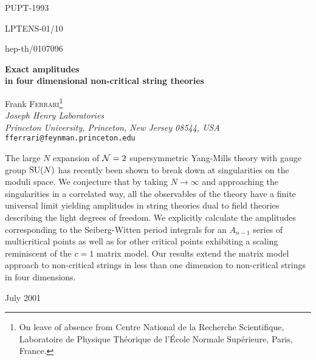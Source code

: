 \documentclass[a4paper,12pt]{article}
\def\suN{{\rm SU}(N)}
\begin{document}
%
%
\pagestyle{empty}
%
{\parskip 0in
\hfill PUPT-1993

\hfill LPTENS-01/10

\hfill hep-th/0107096}

\vfill
%
\begin{center}
{\large\bf Exact amplitudes} \\
\medskip
{\large\bf in four dimensional non-critical string theories}

\vspace{0.4in}

Frank F{\scshape errari}\footnote{On leave of absence from Centre 
National de la Recherche Scientifique, Laboratoire de Physique 
Th\'eorique de l'\'Ecole Normale Sup\'erieure, Paris, France.}\\
\medskip
{\it Joseph Henry Laboratories\\
Princeton University, Princeton, New Jersey 08544, USA}\\
\smallskip
{\tt fferrari@feynman.princeton.edu}
\end{center}
%

\vfill\noindent
The large $N$ expansion of ${\cal N}=2$ supersymmetric Yang-Mills theory 
with gauge group $\suN$ has 
recently been shown to break down at singularities on the moduli space. 
We conjecture that by taking $N\rightarrow\infty$ and approaching the
singularities in a correlated way, all the observables of the theory have
a finite universal limit yielding amplitudes in string theories dual to
field theories describing the light degrees of freedom.
We explicitly calculate the amplitudes corresponding to the
Seiberg-Witten period integrals for an $A_{n-1}$ series of 
multicritical points as well as for other critical points 
exhibiting a scaling reminiscent of the $c=1$ matrix model.
Our results extend the matrix model approach to non-critical 
strings in less than one dimension to non-critical strings in 
four dimensions.
\vfill
\begin{flushleft}
July 2001
\end{flushleft}
%
\newpage\pagestyle{plain}
\baselineskip 16pt
%
\end{document}
